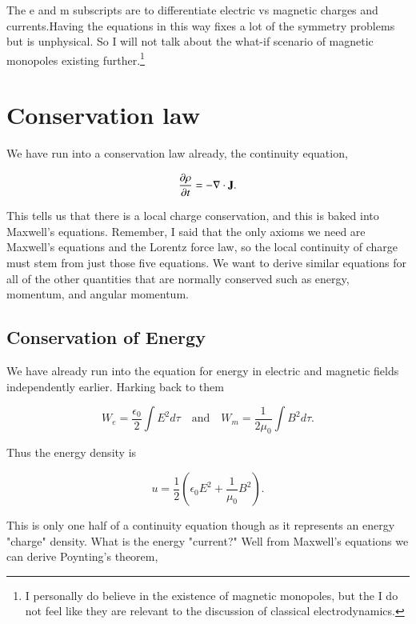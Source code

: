\documentclass[preprint, review,12pt]{elsarticle}
\def\.{\cdot}
\def\b{\textbf}
\def\div{\nabla \.}
\def\and{\quad \text{and} \quad}
\newcommand{\pd}[2]{\frac{\partial #1 }{\partial #2}}
\begin{document}
The e and m subscripts are to differentiate electric vs magnetic charges and currents.Having the equations in this way fixes a lot of the symmetry problems but is unphysical. So I will not talk about the what-if scenario of magnetic monopoles existing further.\footnote{I personally do believe in the existence of magnetic monopoles, but the I do not feel like they are relevant to the discussion of classical electrodynamics.}
    
\section{Conservation law}

We have run into a conservation law already, the continuity equation,

\begin{equation}
     \pd{\rho}{t} = -\div \b J.
\end{equation}

This tells us that there is a local charge conservation, and this is baked into Maxwell's equations. Remember, I said that the only axioms we need are Maxwell's equations and the Lorentz force law, so the local continuity of charge must stem from just those five equations. We want to derive similar equations for all of the other quantities that are normally conserved such as energy, momentum, and angular momentum.


\subsection{Conservation of Energy}

We have already run into the equation for energy in electric and magnetic fields independently earlier. Harking back to them

\begin{equation*}
    W_e = \frac{\epsilon_0}{2} \int E^2 d\tau \and W_m = \frac{1}{2\mu_0} \int B^2 d\tau.
\end{equation*}

Thus the energy density is

\begin{equation}
    u = \frac{1}{2}(\epsilon_0 E^2 + \frac{1}{\mu_0} B^2).
\end{equation}

This is only one half of a continuity equation though as it represents an energy "charge" density. What is the energy "current?" Well from Maxwell's equations we can derive Poynting's theorem,
\end{document}
